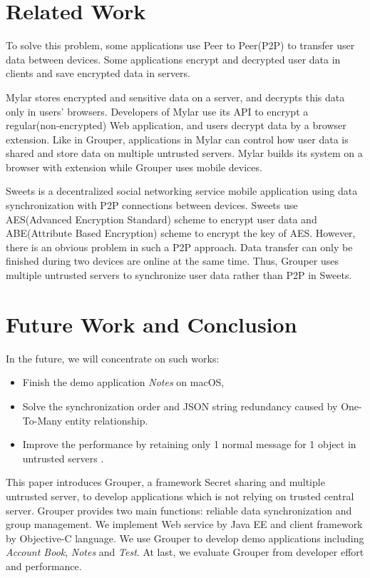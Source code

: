 \documentclass[twocolumn,10pt]{article}
\begin{document}
\section{Related Work}

To solve this problem, some applications use Peer to Peer(P2P) to transfer user data between devices. Some applications encrypt and decrypted user data in clients and save encrypted data in servers. 

Mylar\cite{popa2014building} stores encrypted and sensitive data on a server, and decrypts this data only in users’ browsers. Developers of Mylar use its API to encrypt a regular(non-encrypted) Web application, and users decrypt data by a browser extension. Like in Grouper, applications in Mylar can control how user data is shared and store data on multiple untrusted servers. Mylar builds its system on a browser with extension while Grouper uses mobile devices.

Sweets\cite{sweets} is a decentralized social networking service mobile application using data synchronization with P2P connections between devices. Sweets use AES(Advanced Encryption Standard) scheme to encrypt user data and ABE(Attribute Based Encryption) scheme to encrypt the key of AES. However, there is an obvious problem in such a P2P approach. Data transfer can only be finished during two devices are online at the same time. Thus, Grouper uses multiple untrusted servers to synchronize user data rather than P2P in Sweets.

\section{Future Work and Conclusion}

In the future, we will concentrate on such works:
\begin{itemize}
	\setlength{\itemsep}{1pt}
	\setlength{\parskip}{0pt}
	\setlength{\parsep}{0pt}
	\item Finish the demo application \emph{Notes} on macOS,
	\item Solve the synchronization order and JSON string redundancy caused by One-To-Many entity relationship.
	\item Improve the performance by retaining only 1 normal message for 1 object in untrusted servers .
\end{itemize}

This paper introduces Grouper, a framework Secret sharing and multiple untrusted server, to develop applications which is not relying on trusted central server. Grouper provides two main functions: reliable data synchronization and group management. We implement Web service by Java EE and client framework by Objective-C language. We use Grouper to develop demo applications including \emph{Account Book}, \emph{Notes} and \emph{Test}. At last, we evaluate Grouper from developer effort and performance.


{
	\footnotesize
	
}
\end{document}
